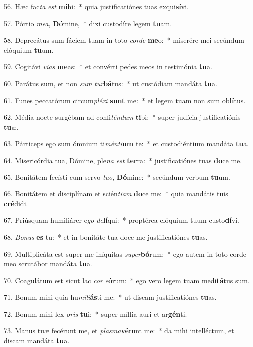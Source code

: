56. Hæc fac\textit{ta} \textit{est} \textbf{mi}hi:~*  quia justificatiónes tuas exqui\textbf{sí}vi.\

57. Pórtio \textit{me}\textit{a}, \textbf{Dó}mine,~*  dixi custodíre legem \textbf{tu}am.\

58. Deprecátus sum fáciem tuam in toto \textit{cor}\textit{de} \textbf{me}o:~*  miserére mei secúndum elóquium \textbf{tu}um.\

59. Cogitávi \textit{vi}\textit{as} \textbf{me}as:~*  et convérti pedes meos in testimónia \textbf{tu}a.\

60. Parátus sum, et non \textit{sum} \textit{tur}\textbf{bá}tus:~*  ut custódiam mandáta \textbf{tu}a.\

61. Funes peccatórum circum\textit{plé}\textit{xi} \textbf{sunt} me:~*  et legem tuam non sum ob\textbf{lí}tus.\

62. Média nocte surgébam ad confi\textit{tén}\textit{dum} \textbf{ti}bi:~*  super judícia justificatiónis \textbf{tu}æ.\

63. Párticeps ego sum ómnium ti\textit{mén}\textit{ti}\textbf{um} te:~*  et custodiéntium mandáta \textbf{tu}a.\

64. Misericórdia tua, Dómine, ple\textit{na} \textit{est} \textbf{ter}ra:~*  justificatiónes tuas \textbf{do}ce me.\

65. Bonitátem fecísti cum servo \textit{tu}\textit{o}, \textbf{Dó}mine:~*  secúndum verbum \textbf{tu}um.\

66. Bonitátem et disciplínam et scién\textit{ti}\textit{am} \textbf{do}ce me:~*  quia mandátis tuis \textbf{cré}didi.\

67. Priúsquam humiliárer e\textit{go} \textit{de}\textbf{lí}qui:~*  proptérea elóquium tuum custo\textbf{dí}vi.\

68. \textit{Bo}\textit{nus} \textbf{es} tu:~*  et in bonitáte tua doce me justificatiónes \textbf{tu}as.\

69. Multiplicáta est super me iníquitas \textit{su}\textit{per}\textbf{bó}rum:~*  ego autem in toto corde meo scrutábor mandáta \textbf{tu}a.\

70. Coagulátum est sicut lac \textit{cor} \textit{e}\textbf{ó}rum:~*  ego vero legem tuam medi\textbf{tá}tus sum.\

71. Bonum mihi quia hu\textit{mi}\textit{li}\textbf{ás}ti me:~*  ut discam justificatiónes \textbf{tu}as.\

72. Bonum mihi lex \textit{o}\textit{ris} \textbf{tu}i:~*  super míllia auri et ar\textbf{gén}ti.\

73. Manus tuæ fecérunt me, et \textit{plas}\textit{ma}\textbf{vé}runt me:~*  da mihi intelléctum, et discam mandáta \textbf{tu}a.\

